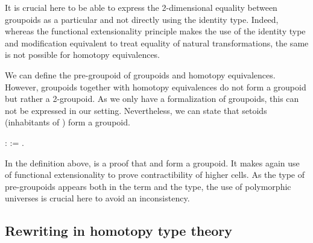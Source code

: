 It is crucial here to be able to express the 2-dimensional equality
  between groupoids as a particular  and not directly using the
  identity type. Indeed, whereas the functional extensionality principle
  makes the use of the identity type and modification equivalent to
  treat equality of natural transformations, the same is not possible
  for homotopy equivalences.  \begin{coqdoccode}
\coqdocemptyline
\end{coqdoccode}
We can define the pre-groupoid  of groupoids and homotopy
 equivalences.  However, groupoids together with homotopy equivalences
 do not form a groupoid but rather a 2-groupoid. As we only have a
 formalization of groupoids, this can not be expressed in our
 setting. Nevertheless, we can state that setoids (inhabitants of
 ) form a groupoid.  \begin{coqdoccode}
\coqdocemptyline
\coqdocnoindent
{}  :  := \coqdocnotation{(} \coqdocnotation{;} \coqdocnotation{)}.\coqdoceol
\coqdocemptyline
\end{coqdoccode}
\noindent In the definition above,  is a proof
that  and  form a groupoid. It makes again use of
functional extensionality to prove contractibility of higher cells.  As
the type of pre-groupoids appears both in the term and the type, the use of
polymorphic universes is crucial here to avoid an inconsistency. \begin{coqdoccode}
\end{coqdoccode}
\subsection{Rewriting in homotopy type theory}


  \label{sec:rew}


